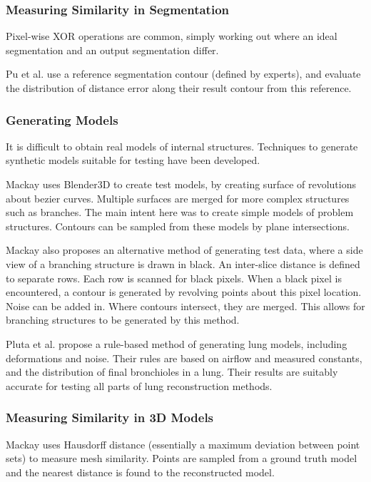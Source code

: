 \documentclass[11p, titlepage]{article}
\begin{document}
\subsubsection{Measuring Similarity in Segmentation}

Pixel-wise XOR operations are common, simply working out where an ideal segmentation and an output segmentation differ.

Pu et al. \cite{pu2008adaptive} use a reference segmentation contour (defined by experts), and evaluate the distribution of distance error along their result contour from this reference. 

\subsubsection{Generating Models}

It is difficult to obtain real models of internal structures. Techniques to generate synthetic models suitable for testing have been developed.

Mackay \cite{mackay2019robust} uses Blender3D to create test models, by creating surface of revolutions about bezier curves. Multiple surfaces are merged for more complex structures such as branches. The main intent here was to create simple models of problem structures. Contours can be sampled from these models by plane intersections.

Mackay \cite{mackay2019robust} also proposes an alternative method of generating test data, where a side view of a branching structure is drawn in black. An inter-slice distance is defined to separate rows. Each row is scanned for black pixels. When a black pixel is encountered, a contour is generated by revolving points about this pixel location. Noise can be added in. Where contours intersect, they are merged. This allows for branching structures to be generated by this method.

Pluta et al. \cite{pluta2012new} propose a rule-based method of generating lung models, including deformations and noise. Their rules are based on airflow and measured constants, and the distribution of final bronchioles in a lung. Their results are suitably accurate for testing all parts of lung reconstruction methods.

\subsubsection{Measuring Similarity in 3D Models}

Mackay \cite{mackay2019robust} uses Hausdorff distance (essentially a maximum deviation between point sets) to measure mesh similarity. Points are sampled from a ground truth model and the nearest distance is found to the reconstructed model.
\end{document}
